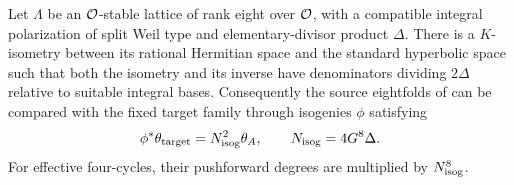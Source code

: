\begin{proposition}\label{SQ7}
Let $\Lambda$ be an $\mathcal O$-stable lattice of rank eight over $\mathcal O$, with a compatible integral polarization of split Weil type and elementary-divisor product $\Delta$. There is a $K$-isometry between its rational Hermitian space and the standard hyperbolic space such that both the isometry and its inverse have denominators dividing $2\Delta$ relative to suitable integral bases. Consequently the source eightfolds of  can be compared with the fixed target family through isogenies $\phi$ satisfying
\[
 \phi^*\theta_{\rm target}=N_{\rm isog}^{2}\theta_A,
 \qquad N_{\rm isog}=4G^8\Delta.
\]
For effective four-cycles, their pushforward degrees are multiplied by $N_{\rm isog}^{8}$.
\end{proposition}
